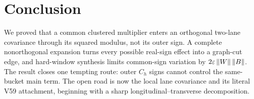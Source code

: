 \section{Conclusion}

We proved that a common clustered multiplier enters an orthogonal two-lane
covariance through its squared modulus, not its outer sign.  A complete
nonorthogonal expansion turns every possible real-sign effect into a graph-cut
edge, and hard-window synthesis limits common-sign variation by
$2\varepsilon\left\lVert W\right\rVert\left\lVert B\right\rVert$.  The result closes one tempting route: outer $C_h$
signs cannot control the same-bucket main term.  The open road is now the local
lane covariance and its literal V59 attachment, beginning with a sharp
longitudinal--transverse decomposition.
